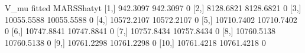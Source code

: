 \begin{Schunk}
\begin{Soutput}
            V_mu     fitted MARSShatyt
 [1,]   942.3097   942.3097          0
 [2,]  8128.6821  8128.6821          0
 [3,] 10055.5588 10055.5588          0
 [4,] 10572.2107 10572.2107          0
 [5,] 10710.7402 10710.7402          0
 [6,] 10747.8841 10747.8841          0
 [7,] 10757.8434 10757.8434          0
 [8,] 10760.5138 10760.5138          0
 [9,] 10761.2298 10761.2298          0
[10,] 10761.4218 10761.4218          0
\end{Soutput}
\end{Schunk}
